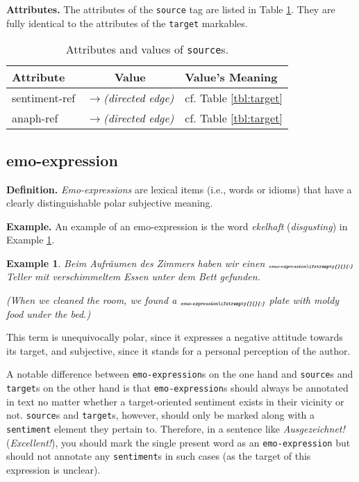 \documentclass[11pt,a4paper]{article}
\newlength{\clmnwidth}
\theoremstyle{mytheoremstyle}
\newtheorem{exmp}{Example}[section]
\newcommand{\mtag}[2]{{\upshape[\emph{#2}\upshape]$_{\textrm{\bfseries\emph{\tiny
        #1}}}$}}
\newcommand{\emoexpression}[2][]{\mtag{emo-\-ex\-pression\ifstrempty{#1}{}{:#1}}{#2}}
\begin{document}
\noindent\textbf{Attributes.} The attributes of the \texttt{source}
tag are listed in Table \ref{tbl:source}.  They are fully identical to
the attributes of the \texttt{target} markables.
\begin{center}
  \begin{table}[h]
    \caption{Attributes and values of \texttt{source}s.}
    \begin{tabular}{|l|c|p{0.935\clmnwidth}|}\hline
      Attribute & Value & Value's Meaning\\\hline

      sentiment-ref & \textit{$\longrightarrow$\newline(directed
        edge)} & cf. Table \ref{tbl:target}\\\hline

      anaph-ref & \textit{$\longrightarrow$\newline(directed edge)} &
      cf. Table \ref{tbl:target}\\\hline
    \end{tabular}\label{tbl:source}
  \end{table}
\end{center}

\subsection{emo-expression}
\noindent\textbf{Definition.} \emph{Emo-expressions} are lexical items
(i.e., words or idioms) that have a clearly distinguishable polar
subjective meaning.

\noindent\textbf{Example.} An example of an emo-expression is the word
\textit{ekelhaft} (\textit{disgusting}) in Example
\ref{exmp:emo-expr1}.
\begin{exmp}
  Beim Aufr\"aumen des Zimmers haben wir einen
  \emoexpression{ekelhaften} Teller mit verschimmeltem Essen unter dem
  Bett gefunden.

  (When we cleaned the room, we found a \emoexpression{disgusting}
  plate with moldy food under the bed.)\label{exmp:emo-expr1}
\end{exmp}
\noindent{} This term is unequivocally polar, since it expresses a
negative attitude towards its target, and subjective, since it stands
for a personal perception of the author.

A notable difference between \texttt{emo-expression}s on the one hand
and \texttt{source}s and \texttt{target}s on the other hand is that
\texttt{emo-ex\-pre\-ssion}s should always be annotated in text no
matter whether a target-oriented sentiment exists in their vicinity or
not. \texttt{source}s and \texttt{target}s, however, should only be
marked along with a \texttt{sentiment} element they pertain to.
Therefore, in a sentence like \emph{Ausgezeichnet!}
(\emph{Excellent!}), you should mark the single present word as an
\texttt{emo-expression} but should not annotate any
\texttt{sentiment}s in such cases (as the target of this expression is
unclear).
\end{document}
